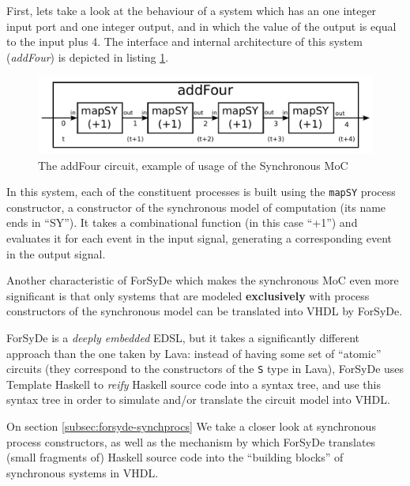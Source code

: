 \documentclass[a4paper]{article}
\begin{document}
                First, lets take a look at the behaviour of a system which has an one integer input
                port and one integer output, and in which the value of the output is equal to the
                input plus 4. The interface and internal architecture of this system
                (\emph{addFour}) is depicted in listing \ref{lst:forsyde-addFour}.

                \begin{figure}[h!]
                    \includegraphics[width=1.0\textwidth]{imgs/forsyde-addFour.pdf}
                    \caption{The addFour circuit, example of usage of the Synchronous MoC
                        \label{lst:forsyde-addFour}}
                \end{figure}

                In this system, each of the constituent processes is built using the \texttt{mapSY}
                process constructor, a constructor of the synchronous model of computation (its name
                ends in ``SY''). It takes a combinational function (in this case ``+1'') and
                evaluates it for each event in the input signal, generating a corresponding event in
                the output signal.

                Another characteristic of ForSyDe which makes the synchronous MoC even more
                significant is that only systems that are modeled \textbf{exclusively} with process
                constructors of the synchronous model can be translated into VHDL by ForSyDe.

                ForSyDe is a \emph{deeply embedded} EDSL, but it takes a significantly different
                approach than the one taken by Lava: instead of having some set of ``atomic''
                circuits (they correspond to the constructors of the \texttt{S} type in Lava),
                ForSyDe uses Template Haskell to \emph{reify} Haskell source code into a syntax
                tree, and use this syntax tree in order to simulate and/or translate the circuit
                model into VHDL.

                On section \ref{subsec:forsyde-synchprocs} We take a closer look at synchronous
                process constructors, as well as the mechanism by which ForSyDe translates (small
                fragments of) Haskell source code into the ``building blocks'' of synchronous
                systems in VHDL.
\end{document}

